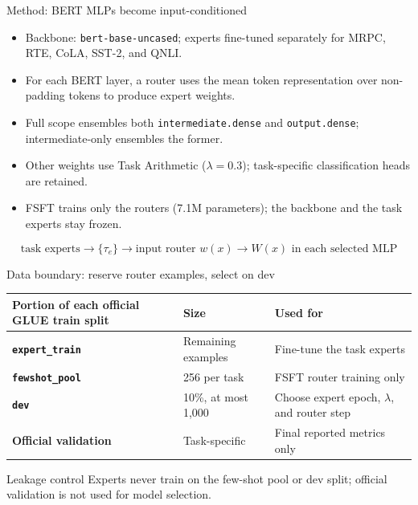 \documentclass[aspectratio=169,10pt]{beamer}
\begin{document}
\begin{frame}{Method: BERT MLPs become input-conditioned}
  \begin{itemize}
    \item Backbone: \texttt{bert-base-uncased}; experts fine-tuned separately for MRPC, RTE, CoLA, SST-2, and QNLI.
    \item For each BERT layer, a router uses the mean token representation over non-padding tokens to produce expert weights.
    \item Full scope ensembles both \texttt{intermediate.dense} and \texttt{output.dense}; intermediate-only ensembles the former.
    \item Other weights use Task Arithmetic ($\lambda=0.3$); task-specific classification heads are retained.
    \item FSFT trains only the routers (7.1M parameters); the backbone and the task experts stay frozen.
  \end{itemize}
  \vfill
  \centering
  \[
    \text{task experts}\longrightarrow\{\tau_e\}
    \longrightarrow\text{input router }w(x)
    \longrightarrow W(x)\text{ in each selected MLP}
  \]
\end{frame}

\begin{frame}{Data boundary: reserve router examples, select on dev}
  \centering
  \small
  \begin{tabularx}{\linewidth}{>{\bfseries}p{3.2cm} p{4cm} X}
    \toprule
    Portion of each official GLUE train split & Size & Used for\\
    \midrule
    \texttt{expert\_train} & Remaining examples & Fine-tune the task experts\\
    \texttt{fewshot\_pool} & 256 per task & FSFT router training only\\
    \texttt{dev} & 10\%, at most 1,000 & Choose expert epoch, $\lambda$, and router step\\
    Official validation & Task-specific & Final reported metrics only\\
    \bottomrule
  \end{tabularx}
  \vfill
  \begin{block}{Leakage control}
    Experts never train on the few-shot pool or dev split; official validation is not used for model selection.
  \end{block}
\end{frame}
\end{document}
